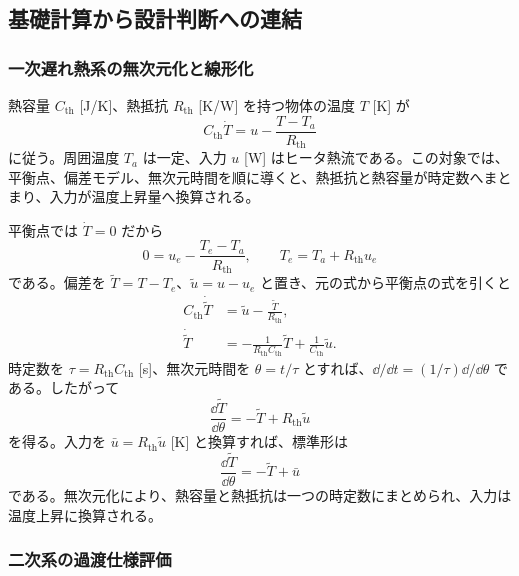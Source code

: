 \subsection{基礎計算から設計判断への連結}

\subsubsection{一次遅れ熱系の無次元化と線形化}

熱容量 $C_{\mathrm{th}}$ [J/K]、熱抵抗 $R_{\mathrm{th}}$ [K/W] を持つ物体の温度 $T$ [K] が
\begin{equation}
  C_{\mathrm{th}}\dot{T}
  =
  u-\frac{T-T_a}{R_{\mathrm{th}}}
\end{equation}
に従う。周囲温度 $T_a$ は一定、入力 $u$ [W] はヒータ熱流である。この対象では、平衡点、偏差モデル、無次元時間を順に導くと、熱抵抗と熱容量が時定数へまとまり、入力が温度上昇量へ換算される。

\begin{derivation}
平衡点では $\dot{T}=0$ だから
\begin{equation}
  0=u_e-\frac{T_e-T_a}{R_{\mathrm{th}}},
  \qquad
  T_e=T_a+R_{\mathrm{th}}u_e
\end{equation}
である。偏差を $\tilde{T}=T-T_e$、$\tilde{u}=u-u_e$ と置き、元の式から平衡点の式を引くと
\begin{align}
  C_{\mathrm{th}}\dot{\tilde{T}}
  &=
  \tilde{u}
  -\frac{\tilde{T}}{R_{\mathrm{th}}},\\
  \dot{\tilde{T}}
  &=
  -\frac{1}{R_{\mathrm{th}}C_{\mathrm{th}}}\tilde{T}
  +\frac{1}{C_{\mathrm{th}}}\tilde{u}.
\end{align}
時定数を $\tau=R_{\mathrm{th}}C_{\mathrm{th}}$ [s]、無次元時間を $\theta=t/\tau$ とすれば、$\dd/\dd t=(1/\tau)\dd/\dd\theta$ である。したがって
\begin{equation}
  \frac{\dd \tilde{T}}{\dd\theta}
  =
  -\tilde{T}+R_{\mathrm{th}}\tilde{u}
\end{equation}
を得る。入力を $\bar{u}=R_{\mathrm{th}}\tilde{u}$ [K] と換算すれば、標準形は
\begin{equation}
  \frac{\dd \tilde{T}}{\dd\theta}=-\tilde{T}+\bar{u}
\end{equation}
である。無次元化により、熱容量と熱抵抗は一つの時定数にまとめられ、入力は温度上昇に換算される。
\end{derivation}

\subsubsection{二次系の過渡仕様評価}

